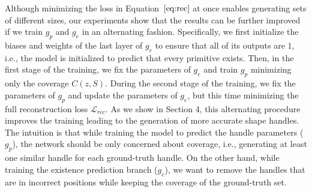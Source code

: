 Although minimizing the loss in Equation~$\ref{eq:rec}$ at once enables
generating sets of different sizes, our experiments show that the
results can be further improved if we train $g_p$ and $g_e$ in an alternating fashion.
Specifically, we first initialize the biases and weights of the last layer of $g_e$ to ensure
that all of its outputs are $1$, i.e., the model is initialized to predict that every primitive exists.
Then, in the first stage of the training, we fix the parameters of $g_e$ and train $g_p$ minimizing only the coverage
$C(z, S)$.
During the second stage of the training, we fix the parameters of $g_p$ and
update the parameters of $g_e$, but this time minimizing the full reconstruction loss
$\mathcal{L}_{rec}$.
As we show in Section 4, this alternating procedure improves the training leading to the generation of more
accurate shape handles.  
The intuition is that while training the model to predict the handle parameters ($g_p$), the
network should be only concerned about coverage, i.e., generating at least one similar handle for each 
ground-truth handle.
On the other hand, while training the existence prediction branch ($g_e$), we want
to remove the handles that are in incorrect positions while keeping the coverage of the ground-truth set. %

